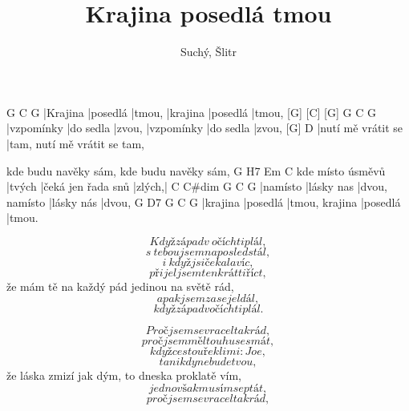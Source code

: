 \documentclass{song}
\title{Krajina posedlá tmou}
\author{Suchý, Šlitr}
\begin{document}
\strophe
[G]     [C]      [G]      G        C        G
|Krajina |posedlá |tmou, |krajina |posedlá |tmou,
[G]       [C]        [G]     G          C         G
|vzpomínky |do sedla |zvou, |vzpomínky |do sedla |zvou,
[G]                D
|nutí mě vrátit se |tam, nutí mě vrátit se tam,

kde budu navěky sám, kde budu navěky sám,
                 G      H7                 Em     C
kde místo úsměvů |tvých |čeká jen řada snů |zlých,|
C        C\#dim     G              C          G
|namísto |lásky nas |dvou, namísto |lásky nás |dvou,
G        D7       G              C        G
|krajina |posedlá |tmou, krajina |posedlá |tmou.
\endstrophe

\strophe*
\[ Když západ v~očích ti plál, \]
\[ s~tebou jsem naposled stál, \]
\[ i~když jsi čekala víc, \]
\[ přijel jsem tenkrát ti říct, \]
že mám tě na každý pád jedinou na světě rád,
\[ a pak jsem zase jel dál, \]
\[ když západ v očích ti plál. \]
\endstrophe

\strophe*
\[ Proč jsem se vracel tak rád, \]
\[ proč jsem měl touhu se smát, \]
\[ když cestou řekli mi: Joe, \]
\[ ta nikdy nebude tvou, \]
že láska zmizí jak dým, to dneska proklatě vím,
\[ jedno však musím se ptát, \]
\[ proč jsem se vracel tak rád, \]
\endstrophe
\end{document}
